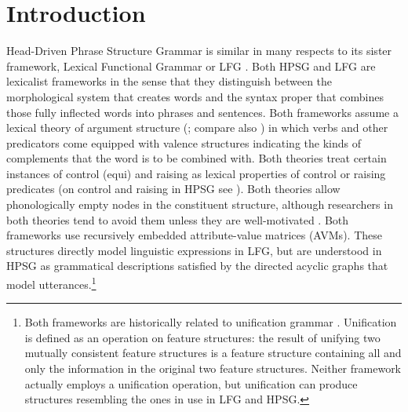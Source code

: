 



\newcommand{\ednote}[1]{}


\maketitle
\label{chap-lfg}




\section{Introduction} 
\label{intro-sec}
Head-Driven Phrase Structure Grammar is similar in many respects to its sister framework, Lexical
Functional Grammar or LFG \citep{BATW2016a,dalrymple;ea19}.  Both HPSG and LFG are lexicalist
frameworks in the sense that they distinguish between the morphological system that creates words
and the syntax proper that combines those fully inflected words into phrases and sentences.  Both
frameworks assume a lexical theory of argument structure (\citealp{MWArgSt}; compare also
) in which verbs and other predicators come equipped with valence
structures indicating the kinds of complements that the word is to be combined with.  Both theories
treat certain instances of control (equi) and raising as lexical properties of control or raising
predicates (on control and raising in HPSG see ). Both theories
allow phonologically empty nodes in the constituent structure, although researchers in both theories
tend to avoid them unless they are well-motivated
\parencites{SF94a}{Berman97a}[734--742]{dalrymple;ea19}.
Both frameworks use recursively embedded attribute-value matrices (AVMs). These structures directly model linguistic expressions in LFG, but are understood in HPSG as grammatical descriptions satisfied by the directed acyclic graphs that model utterances.\footnote{Both frameworks are historically related to unification grammar \citep{Kay84a-u}.  Unification is defined as an operation on feature structures:  the result of unifying two mutually consistent feature structures is a feature structure containing all and only the information in the original two feature structures.  Neither framework actually employs a unification operation, but unification can produce structures resembling the ones in use in LFG and HPSG.} 

